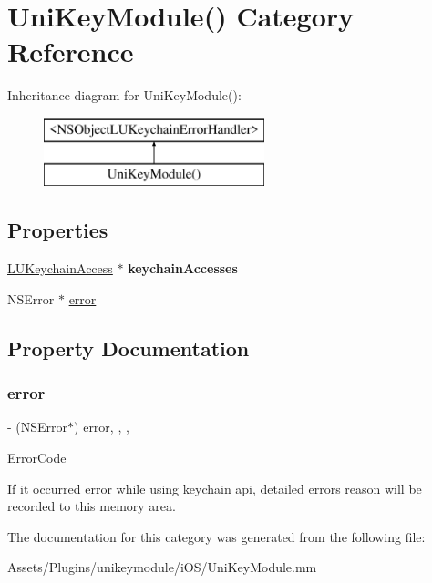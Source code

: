 \hypertarget{category_uni_key_module_07_08}{}\section{Uni\+Key\+Module() Category Reference}
\label{category_uni_key_module_07_08}
Inheritance diagram for Uni\+Key\+Module()\+:\begin{figure}[H]
\begin{center}
\leavevmode
\includegraphics[height=2.000000cm]{category_uni_key_module_07_08}
\end{center}
\end{figure}
\subsection*{Properties}
\begin{DoxyCompactItemize}
\item 
\mbox{\label{category_uni_key_module_07_08_a60acaad29a9f55a0833d1fb8ecd325cc}} 
\mbox{\hyperlink{interface_l_u_keychain_access}{L\+U\+Keychain\+Access}} $\ast$ {\bfseries keychain\+Accesses}
\item 
N\+S\+Error $\ast$ \mbox{\hyperlink{category_uni_key_module_07_08_aa944f0b4ca37d1922b1c13d97903f3e8}{error}}
\end{DoxyCompactItemize}


\subsection{Property Documentation}
\mbox{\label{category_uni_key_module_07_08_aa944f0b4ca37d1922b1c13d97903f3e8}} 
\subsubsection{\texorpdfstring{error}{error}}
{\footnotesize\ttfamily -\/ (N\+S\+Error$\ast$) error\hspace{0.3cm}{\ttfamily [read]}, {\ttfamily [write]}, {\ttfamily [nonatomic]}, {\ttfamily [strong]}}

Error\+Code

If it occurred error while using keychain api, detailed errors reason will be recorded to this memory area. 

The documentation for this category was generated from the following file\+:\begin{DoxyCompactItemize}
\item 
Assets/\+Plugins/unikeymodule/i\+O\+S/Uni\+Key\+Module.\+mm\end{DoxyCompactItemize}
